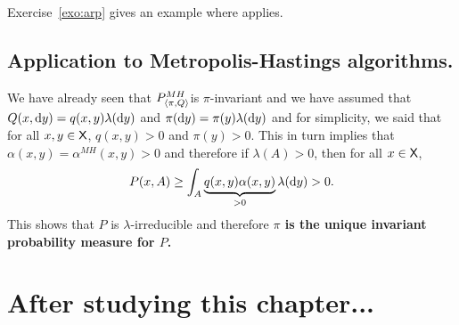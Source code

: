 \documentclass[english,graybox,envcountchap,envcountsame,sectrefs,shortlabels]{svmono}
\theoremstyle{style}
\begin{document}
Exercise~\ref{exo:arp} gives an example where  applies.
\subsection{\label{subsec:MH:uniq}Application to Metropolis-Hastings algorithms. }

We have already seen that $P_{\langle\pi,Q\rangle}^{MH}$is $\pi$-invariant and we
have assumed that $Q(x,\mathrm{d} y)=q(x,y)\lambda(\mathrm{d} y)$ and $\pi(\mathrm{d} y)=\pi(y)\lambda(\mathrm{d} y)$
and for simplicity, we said that for all $x,y\in\mathsf{X}$, $q(x,y)>0$
and $\pi(y)>0$. This in turn implies that $\alpha(x,y)=\alpha^{MH}(x,y)>0$
and therefore if $\lambda(A)>0$, then for all $x\in\mathsf{X}$,
\[
P(x,A)\geq\int_{A}\underbrace{q(x,y)\alpha(x,y)}_{>0}\lambda(\mathrm{d} y)>0.
\]
This shows that $P$ is $\lambda$-irreducible and therefore \textbf{$\pi$
is the unique invariant probability measure for $P$.}

\section{After studying this chapter...}
\begin{center}
\end{center}
\end{document}
